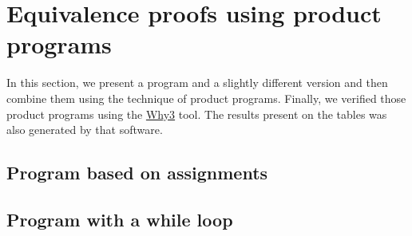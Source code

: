 \section{Equivalence proofs using product programs}
\label{sec:results_eq_proofs_pp}

In this section, we present a program and a slightly different version and then combine them using the technique of product programs. 
Finally, we verified those product programs using the \hyperref[sec:why3]{Why3} tool.
The results present on the tables was also generated by that software.


\subsection{Program based on assignments}
\label{sub:results_assignments}


\subsection{Program with a while loop}
\label{sub:results_while}

